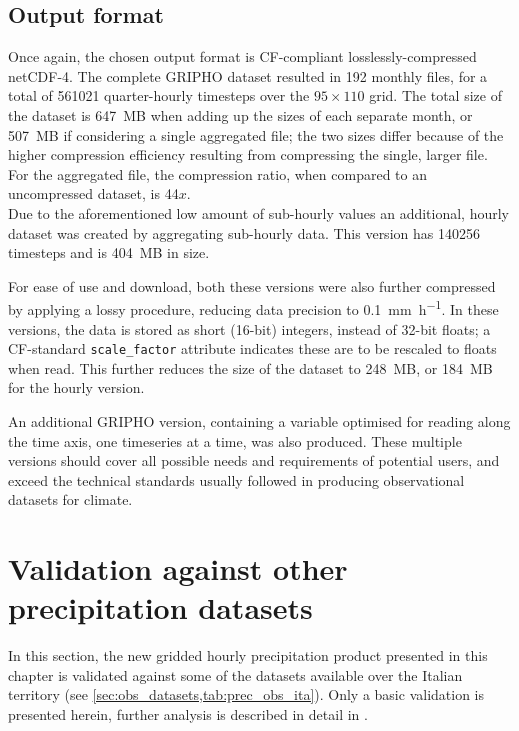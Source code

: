 \subsection{Output format}
Once again, the chosen output format is CF-compliant losslessly-compressed netCDF-4. The complete GRIPHO dataset resulted in 192 monthly files, for a total of 561021 quarter-hourly timesteps over the $95 \times 110$ grid. The total size of the dataset is \SI{647}{\mega B} when adding up the sizes of each separate month, or \SI{507}{\mega B} if considering a single aggregated file; the two sizes differ because of the higher compression efficiency resulting from compressing the single, larger file. For the aggregated file, the compression ratio, when compared to an uncompressed dataset, is 44$x$.\\
Due to the aforementioned low amount of sub-hourly values an additional, hourly dataset was created by aggregating sub-hourly data. This version has 140256 timesteps and is \SI{404}{\mega B} in size.

For ease of use and download, both these versions were also further compressed by applying a lossy procedure, reducing data precision to \SI{0.1}{\milli\meter\per\hour}. In these versions, the data is stored as short (16-bit) integers, instead of 32-bit floats; a CF-standard \texttt{scale\_factor} attribute indicates these are to be rescaled to floats when read. This further reduces the size of the dataset to \SI{248}{\mega B}, or \SI{184}{\mega B} for the hourly version.

An additional GRIPHO version, containing a variable optimised for reading along the time axis, one timeseries at a time, was also produced. These multiple versions should cover all possible needs and requirements of potential users, and exceed the technical standards usually followed in producing observational datasets for climate.

\section{Validation against other precipitation datasets}\label{sec:valid_itaobs}
In this section, the new gridded hourly precipitation product presented in this chapter is validated against some of the datasets available over the Italian territory (see \cref{sec:obs_datasets,tab:prec_obs_ita}).
Only a basic validation is presented herein, further analysis is described in detail in \citet[][in preparation]{Fantini2018a}.

